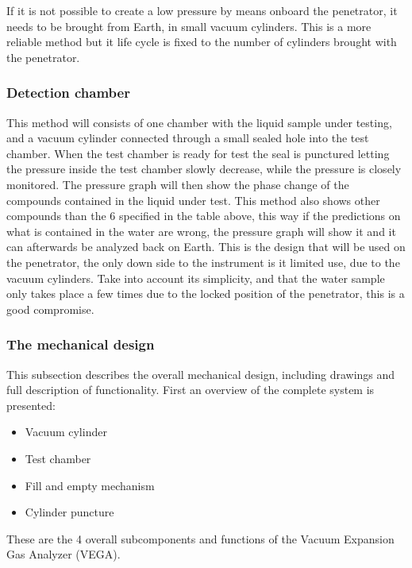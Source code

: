 \documentclass[10pt,a4paper,draft]{report}
\begin{document}
If it is not possible to create a low pressure by means onboard the penetrator, it needs to be brought from Earth, in small vacuum cylinders. This is a more reliable method but it life cycle is fixed to the number of cylinders brought with the penetrator.\par

\subsubsection{Detection chamber}
This method will consists of one chamber with the liquid sample under testing, and a vacuum cylinder connected through a small sealed hole into the test chamber. When the test chamber is ready for test the seal is punctured letting the pressure inside the test chamber slowly decrease, while the pressure is closely monitored. The pressure graph will then show the phase change of the compounds contained in the liquid under test. This method also shows other compounds than the 6 specified in the table above, this way if the predictions on what is contained in the water are wrong, the pressure graph will show it and it can afterwards be analyzed back on Earth. This is the design that will be used on the penetrator, the only down side to the instrument is it limited use, due to the vacuum cylinders. Take into account its simplicity, and that the water sample only takes place a few times due to the locked position of the penetrator, this is a good compromise.

\subsubsection{The mechanical design}
This subsection describes the overall mechanical design, including drawings and full description of functionality. First an overview of the complete system is presented:\par

\begin{itemize}

   \item Vacuum cylinder
   \item Test chamber
   \item Fill and empty mechanism
   \item Cylinder puncture
   
\end{itemize}

These are the 4 overall subcomponents and functions of the Vacuum Expansion Gas Analyzer (VEGA). \par
\end{document}
